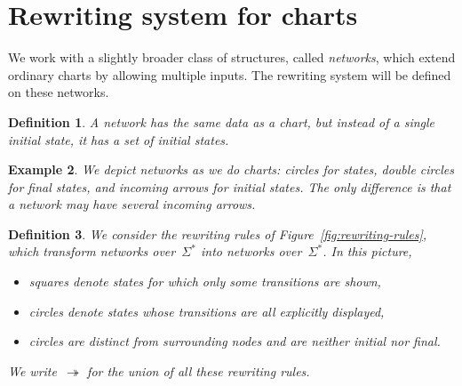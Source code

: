 \documentclass{article}
\newtheorem{definition}{Definition}[section]
\newtheorem{example}[definition]{Example}
\begin{document}
\section{Rewriting system for charts}

We work with a slightly broader class of structures,  
called \emph{networks}, which extend ordinary charts by allowing multiple inputs.  
The rewriting system will be defined on these networks.

\begin{definition}
  A \emph{network} has the same data as a chart, but instead of a single initial state, it has a set of initial states.
\end{definition}

\begin{example}
We depict networks as we do charts: circles for states, double circles for final states, and incoming arrows for initial states. The only difference is that a network may have several incoming arrows. 
\end{example}

\begin{definition} We consider the rewriting rules of Figure~\ref{fig:rewriting-rules}, 
which transform networks over~$\Sigma^*$ into networks over~$\Sigma^*$. 
In this picture,
\begin{itemize}
    \item squares denote states for which only some transitions are shown,
    \item circles denote states whose transitions are all explicitly displayed,
    \item circles are distinct from surrounding nodes and are neither initial nor final.
\end{itemize}
We write~$\twoheadrightarrow$ for the union of all these rewriting rules.
\end{definition}
\end{document}
